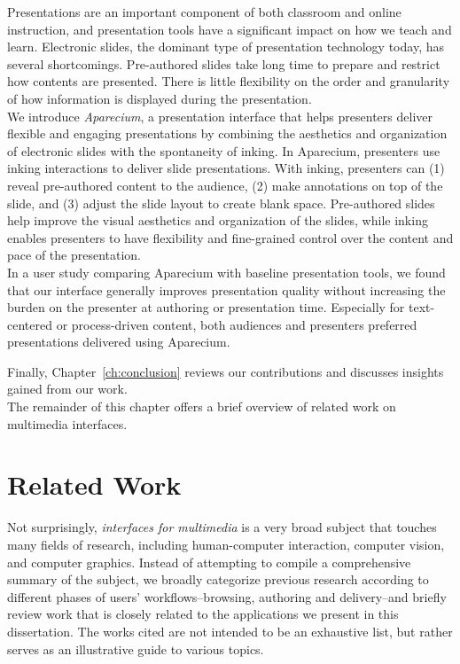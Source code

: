 \begin{mldescription}
Presentations are an important component of both classroom
and online instruction, and presentation tools have a significant impact on how we teach and learn. Electronic slides, the dominant type of presentation technology today, has several shortcomings. Pre-authored slides take long time to prepare and restrict how contents are presented. There is little flexibility on the order and granularity of how information is displayed during the presentation.\\
We introduce \emph{Aparecium}, a presentation interface that helps presenters deliver flexible and engaging presentations by combining
the aesthetics and organization of electronic slides with
the spontaneity of inking. In Aparecium, presenters use inking
interactions to deliver slide presentations. With inking, presenters
can (1) reveal pre-authored content to the audience,
(2) make annotations on top of the slide, and (3) adjust the
slide layout to create blank space. Pre-authored slides help improve
the visual aesthetics and organization of the slides, while
inking enables presenters to have flexibility and fine-grained
control over the content and pace of the presentation.\\
In a user study comparing Aparecium with baseline presentation
tools, we found that our interface generally improves presentation
quality without increasing the burden on the presenter
at authoring or presentation time. Especially for text-centered
or process-driven content, both audiences and presenters preferred
presentations delivered using Aparecium.\\

\end{mldescription}
Finally, Chapter~\ref{ch:conclusion} reviews our contributions and discusses insights gained from our work. \\
The remainder of this chapter offers a brief overview of related work on multimedia interfaces.  

\section{Related Work}
Not surprisingly, \emph{interfaces for multimedia} is a very broad subject that touches many fields of research, including human-computer interaction, computer vision, and computer graphics. Instead of attempting to compile a comprehensive summary of the subject, we broadly categorize previous research according to different phases of users' workflows--browsing, authoring and delivery--and briefly review work that is closely related to the applications we present in this dissertation. The works cited are not intended to be an exhaustive list, but rather serves as an illustrative guide to various topics.

